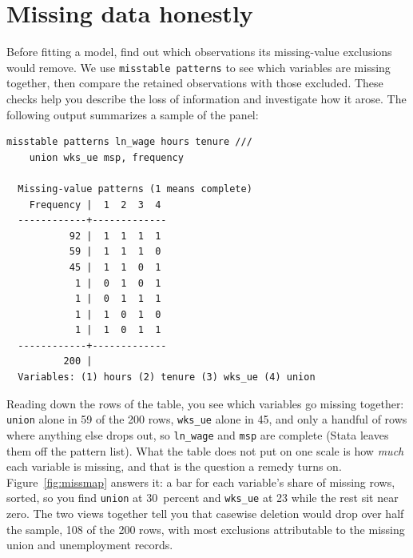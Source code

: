 \section{Missing data honestly}
Before fitting a model, find out which observations its missing-value exclusions would remove. We use \texttt{misstable patterns} to see which variables are missing together, then compare the retained observations with those excluded. These checks help you describe the loss of information and investigate how it arose. The following output summarizes a sample of the panel:
\par
{\footnotesize
\begin{verbatim}
misstable patterns ln_wage hours tenure ///
    union wks_ue msp, frequency

  Missing-value patterns (1 means complete)
    Frequency |  1  2  3  4
  ------------+-------------
           92 |  1  1  1  1
           59 |  1  1  1  0
           45 |  1  1  0  1
            1 |  0  1  0  1
            1 |  0  1  1  1
            1 |  1  0  1  0
            1 |  1  0  1  1
  ------------+-------------
          200 |
  Variables: (1) hours (2) tenure (3) wks_ue (4) union
\end{verbatim}
}
Reading down the rows of the table, you see which variables go missing together: \texttt{union} alone in 59 of the 200 rows, \texttt{wks\_ue} alone in 45, and only a handful of rows where anything else drops out, so \texttt{ln\_wage} and \texttt{msp} are complete (Stata leaves them off the pattern list). What the table does not put on one scale is how \emph{much} each variable is missing, and that is the question a remedy turns on. Figure~\ref{fig:missmap} answers it: a bar for each variable's share of missing rows, sorted, so you find \texttt{union} at 30~percent and \texttt{wks\_ue} at 23 while the rest sit near zero. The two views together tell you that casewise deletion would drop over half the sample, 108 of the 200 rows, with most exclusions attributable to the missing union and unemployment records.

